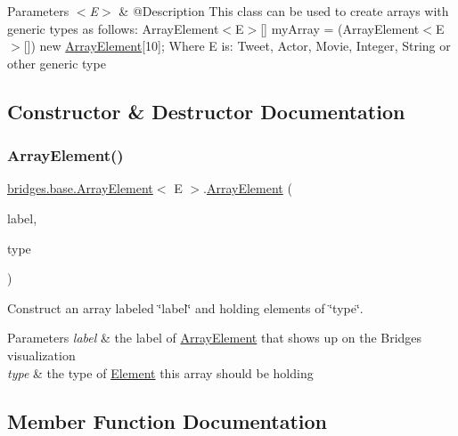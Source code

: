 \begin{DoxyParams}{Parameters}
{\em $<$\+E$>$} & @\+Description This class can be used to create arrays with generic types as follows\+: Array\+Element$<$\+E$>$\mbox{[}\mbox{]} my\+Array = (Array\+Element$<$\+E$>$\mbox{[}\mbox{]}) new \mbox{\hyperlink{classbridges_1_1base_1_1_array_element}{Array\+Element}}\mbox{[}10\mbox{]}; Where E is\+: Tweet, Actor, Movie, Integer, String or other generic type \\
\hline
\end{DoxyParams}


\subsection{Constructor \& Destructor Documentation}
\mbox{\label{classbridges_1_1base_1_1_array_element_a90cbba952d50ff26fd2b89e9f3f81322}} 
\subsubsection{\texorpdfstring{ArrayElement()}{ArrayElement()}}
{\footnotesize\ttfamily \mbox{\hyperlink{classbridges_1_1base_1_1_array_element}{bridges.\+base.\+Array\+Element}}$<$ E $>$.\mbox{\hyperlink{classbridges_1_1base_1_1_array_element}{Array\+Element}} (\begin{DoxyParamCaption}\item[{String}]{label,  }\item[{E}]{type }\end{DoxyParamCaption})}

Construct an array labeled \char`\"{}label\char`\"{} and holding elements of \char`\"{}type\char`\"{}. 
\begin{DoxyParams}{Parameters}
{\em label} & the label of \mbox{\hyperlink{classbridges_1_1base_1_1_array_element}{Array\+Element}} that shows up on the Bridges visualization \\
\hline
{\em type} & the type of \mbox{\hyperlink{classbridges_1_1base_1_1_element}{Element}} this array should be holding \\
\hline
\end{DoxyParams}


\subsection{Member Function Documentation}
\mbox{\label{classbridges_1_1base_1_1_array_element_a1d4f3fae7bd986237e364c2cce0bea77}} 
